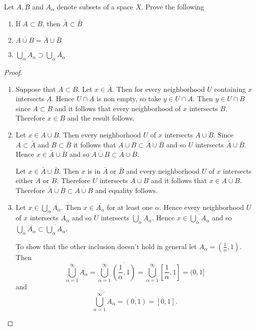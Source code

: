 \begin{ex}{17.6}
    Let $A,B$ and $A_\alpha$ denote subsets of a space $X$. Prove the following
    \begin{enumerate}
        \item If $A\subset B$, then $\bar{A}\subset\bar{B}$
        \item $\overline{A\cup B}=\bar{A}\cup\bar{B}$
        \item $\overline{\bigcup_\alpha A_\alpha}\supset \bigcup_\alpha \overline{A_\alpha}$
    \end{enumerate}
\end{ex}
\begin{proof}
    ${}$
    \begin{enumerate}
        \item Suppose that $A\subset B$. Let $x\in\overline{A}$. Then for every neighborhood $U$ containing $x$ intersects $A$. 
            Hence $U\cap A$ is non empty, so take $y\in U\cap A$. Then $y\in U\cap B$ since $A\subset B$ and it follows that every neighborhood of $x$ intersects $B$.
            Therefore $x\in\overline{B}$ and the result follows.
        \item Let $x\in \overline{A\cup B}$. Then every neighborhood $U$ of $x$ intersects $A\cup B$. Since $A\subset\bar{A}$ and $B\subset\bar{B}$ it follows that $A\cup B\subset\bar{A}\cup\bar{B}$ and so $U$ intersects $\bar{A}\cup\bar{B}$.
            Hence $x\in\bar{A}\cup\bar{B}$ and so $\overline{A\cup B}\subset\bar{A}\cup\bar{B}$.

            Let $x\in \bar{A}\cup\bar{B}$. Then $x$ is in $\bar{A}$ or $\bar{B}$ and every neighborhood $U$ of $x$ intersects either $A$ or $B$. Therefore $U$ intersects $A\cup B$ and it follows that $x\in \overline{A\cup B}$.
            Therefore $\bar{A}\cup\bar{B}\subset\overline{A\cup B}$ and equality follows.
        \item Let $x\in\bigcup_\alpha\overline{A_\alpha}$. Then $x\in\overline{A_\alpha}$ for at least one $\alpha$. Hence every neighborhood $U$ of $x$ intersects $A_\alpha$ and so $U$ intersects $\bigcup_\alpha A_\alpha$. 
            Hence $x\in\overline{\bigcup_\alpha A_\alpha}$ and so $\bigcup_\alpha \overline{A_\alpha}\subset\overline{\bigcup_\alpha A_\alpha}$.

            To show that the other inclusion doesn't hold in general let $A_\alpha=\left(\frac1\alpha, 1\right)$.
            Then 
            $$\bigcup_{\alpha=1}^\infty\overline{A_\alpha}=\bigcup_{\alpha=1}^\infty\overline{\left(\frac1\alpha, 1\right)}=\bigcup_{\alpha=1}^\infty\left[\frac1\alpha, 1\right]=(0, 1]$$
            and
            $$\overline{\bigcup_{\alpha=1}^\infty A_\alpha}=\overline{(0,1)}=[0,1].$$
    \end{enumerate}
\end{proof}

